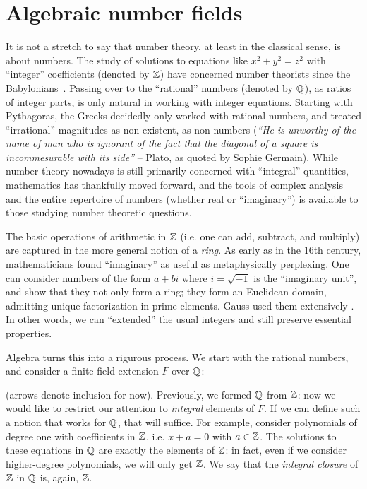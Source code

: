 \section{Algebraic number fields}

It is not a stretch to say that number theory, at least in the classical sense, is about numbers. The study of solutions to equations like $x^2+y^2=z^2$ with ``integer'' coefficients (denoted by $\mathbb{Z}$) have concerned number theorists since the Babylonians~\cite{rouseball}. Passing over to the ``rational'' numbers (denoted by $\mathbb{Q}$), as ratios of integer parts, is only natural in working with integer equations. Starting with Pythagoras, the Greeks decidedly only worked with rational numbers, and treated ``irrational'' magnitudes as non-existent, as non-numbers (\emph{``He is unworthy of the name of man who is ignorant of the fact that the diagonal of a square is incommesurable with its side''} -- Plato, as quoted by Sophie Germain). While number theory nowadays is still primarily concerned with ``integral'' quantities, mathematics has thankfully moved forward, and the tools of complex analysis and the entire repertoire of numbers (whether real or ``imaginary'') is available to those studying number theoretic questions.

The basic operations of arithmetic in $\mathbb{Z}$ (i.e. one can add, subtract, and multiply) are captured in the more general notion of a \emph{ring}. As early as in the 16th century, mathematicians found ``imaginary'' as useful as metaphysically perplexing. One can consider numbers of the form $a+bi$ where $i=\sqrt{-1}$ is the ``imaginary unit'', and show that they not only form a ring; they form an Euclidean domain, admitting unique factorization in prime elements. Gauss used them extensively . In other words, we can ``extended'' the usual integers and still preserve essential properties.

Algebra turns this into a rigurous process. We start with the rational numbers, and consider a finite field extension $F$ over $\mathbb{Q}$:
\begin{center}
\end{center}
(arrows denote inclusion for now). Previously, we formed $\mathbb{Q}$ from $\mathbb{Z}$: now we would like to restrict our attention to \emph{integral} elements of $F$. If we can define such a notion that works for $\mathbb{Q}$, that will suffice. For example, consider polynomials of degree one with coefficients in $\mathbb{Z}$, i.e. $x+a=0$ with $a\in\mathbb{Z}$. The solutions to these equations in $\mathbb{Q}$ are exactly the elements of $\mathbb{Z}$: in fact, even if we consider higher-degree polynomials, we will only get $\mathbb{Z}$. We say that the \emph{integral closure} of $\mathbb{Z}$ in $\mathbb{Q}$ is, again, $\mathbb{Z}$.

